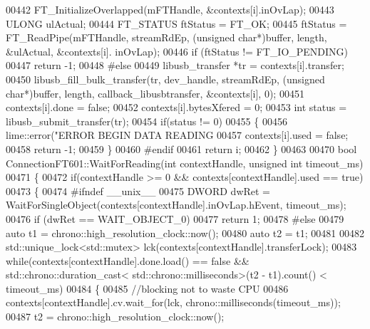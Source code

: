 \begin{DoxyCode}
{{{00442     FT\_InitializeOverlapped(mFTHandle, &contexts[i].inOvLap);
00443     ULONG ulActual;
00444     FT_STATUS ftStatus = FT_OK;
00445     ftStatus = FT\_ReadPipe(mFTHandle, streamRdEp, (\textcolor{keywordtype}{unsigned} \textcolor{keywordtype}{char}*)buffer, length, &ulActual, &contexts[i].
      inOvLap);
00446     \textcolor{keywordflow}{if} (ftStatus != FT_IO_PENDING)
00447         \textcolor{keywordflow}{return} -1;
00448 \textcolor{preprocessor}{#else}
00449     libusb\_transfer *tr = contexts[i].transfer;
00450     libusb\_fill\_bulk\_transfer(tr, dev\_handle, streamRdEp, (\textcolor{keywordtype}{unsigned} \textcolor{keywordtype}{char}*)buffer, length, 
      callback\_libusbtransfer, &contexts[i], 0);
00451     contexts[i].done = \textcolor{keyword}{false};
00452     contexts[i].bytesXfered = 0;
00453     \textcolor{keywordtype}{int} status = libusb\_submit\_transfer(tr);
00454     \textcolor{keywordflow}{if}(status != 0)
00455     \{
00456         lime::error(\textcolor{stringliteral}{"ERROR BEGIN DATA READING %
00457         contexts[i].used = \textcolor{keyword}{false};
00458         \textcolor{keywordflow}{return} -1;
00459     \}
00460 \textcolor{preprocessor}{#endif}
00461     \textcolor{keywordflow}{return} i;
00462 \}
00463 
00470 \textcolor{keywordtype}{bool} ConnectionFT601::WaitForReading(\textcolor{keywordtype}{int} contextHandle, \textcolor{keywordtype}{unsigned} \textcolor{keywordtype}{int} timeout_ms)
00471 \{
00472     \textcolor{keywordflow}{if}(contextHandle >= 0 && contexts[contextHandle].used == \textcolor{keyword}{true})
00473     \{
00474 \textcolor{preprocessor}{#ifndef \_\_unix\_\_}
00475         DWORD dwRet = WaitForSingleObject(contexts[contextHandle].inOvLap.hEvent, timeout\_ms);
00476             \textcolor{keywordflow}{if} (dwRet == WAIT\_OBJECT\_0)
00477                 \textcolor{keywordflow}{return} 1;
00478 \textcolor{preprocessor}{#else}
00479         \textcolor{keyword}{auto} t1 = chrono::high\_resolution\_clock::now();
00480         \textcolor{keyword}{auto} t2 = t1;
00481 
00482         std::unique\_lock<std::mutex> lck(contexts[contextHandle].transferLock);
00483         \textcolor{keywordflow}{while}(contexts[contextHandle].done.load() == \textcolor{keyword}{false} && std::chrono::duration\_cast<
      std::chrono::milliseconds>(t2 - t1).count() < timeout_ms)
00484         \{
00485             \textcolor{comment}{//blocking not to waste CPU}
00486             contexts[contextHandle].cv.wait\_for(lck, chrono::milliseconds(timeout\_ms));
00487             t2 = chrono::high\_resolution\_clock::now();
}}}}
\end{DoxyCode}
